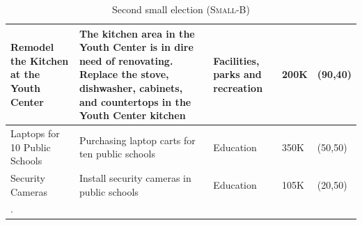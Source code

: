 \documentclass{comsoc2023}
\begin{document}
\begin{longtable}[ht!]{|p{2cm}|p{6cm}|p{3cm}|p{1cm}|p{2.5cm}|}
    \hline
    Remodel the Kitchen at the Youth Center & The kitchen area in the Youth Center is in dire need of renovating. Replace the stove, dishwasher, cabinets, and countertops in the Youth Center kitchen & Facilities, parks and recreation & 200K & (90,40)\\
    \hline
    Laptops for 10 Public Schools & Purchasing laptop carts for ten public schools & Education & 350K & (50,50)\\
    \hline
    Security Cameras & Install security cameras in public schools & Education & 105K & (20,50)\\
     \hline
  \caption{Second small election (\textsc{Small-B})}\label{tab:second_elc}.
\end{longtable}
\end{document}
